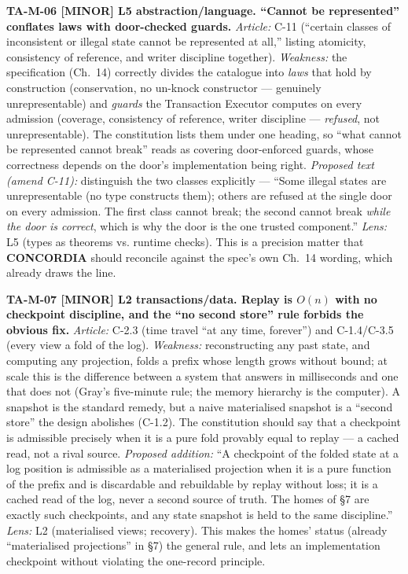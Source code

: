 \documentclass[11pt,a4paper]{article}
\newcommand{\sev}[1]{\textbf{[#1]}}
\newcommand{\lens}[1]{\textnormal{#1}}
\newcommand{\finding}[1]{\medskip\noindent\textbf{#1}}
\begin{document}
\finding{TA-M-06 \sev{MINOR} \lens{L5 abstraction/language}. ``Cannot be represented'' conflates
laws with door-checked guards.}
\emph{Article:} C-11 (``certain classes of inconsistent or illegal state cannot be represented
at all,'' listing atomicity, consistency of reference, and writer discipline together).
\emph{Weakness:} the specification (Ch.~14) correctly divides the catalogue into \emph{laws}
that hold by construction (conservation, no un-knock constructor --- genuinely unrepresentable)
and \emph{guards} the Transaction Executor computes on every admission (coverage, consistency of
reference, writer discipline --- \emph{refused}, not unrepresentable). The constitution lists
them under one heading, so ``what cannot be represented cannot break'' reads as covering
door-enforced guards, whose correctness depends on the door's implementation being right.
\emph{Proposed text (amend C-11):} distinguish the two classes explicitly --- ``Some illegal
states are unrepresentable (no type constructs them); others are refused at the single door on
every admission. The first class cannot break; the second cannot break \emph{while the door is
correct}, which is why the door is the one trusted component.'' \emph{Lens:} L5 (types as
theorems vs. runtime checks). This is a precision matter that \textbf{CONCORDIA} should
reconcile against the spec's own Ch.~14 wording, which already draws the line.

\finding{TA-M-07 \sev{MINOR} \lens{L2 transactions/data}. Replay is $O(n)$ with no checkpoint
discipline, and the ``no second store'' rule forbids the obvious fix.}
\emph{Article:} C-2.3 (time travel ``at any time, forever'') and C-1.4/C-3.5 (every view a fold
of the log). \emph{Weakness:} reconstructing any past state, and computing any projection, folds
a prefix whose length grows without bound; at scale this is the difference between a system that
answers in milliseconds and one that does not (Gray's five-minute rule; the memory hierarchy is
the computer). A snapshot is the standard remedy, but a naive materialised snapshot is a
``second store'' the design abolishes (C-1.2). The constitution should say that a checkpoint is
admissible precisely when it is a pure fold provably equal to replay --- a cached read, not a
rival source. \emph{Proposed addition:} ``A checkpoint of the folded state at a log position is
admissible as a materialised projection when it is a pure function of the prefix and is
discardable and rebuildable by replay without loss; it is a cached read of the log, never a
second source of truth. The homes of §7 are exactly such checkpoints, and any state snapshot is
held to the same discipline.'' \emph{Lens:} L2 (materialised views; recovery). This makes the
homes' status (already ``materialised projections'' in §7) the general rule, and lets an
implementation checkpoint without violating the one-record principle.
\end{document}
